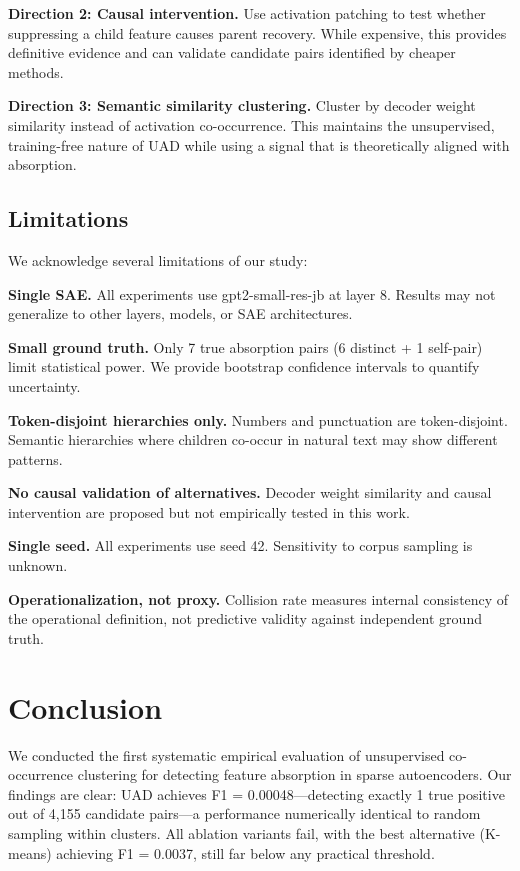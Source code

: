 \documentclass{article}
\begin{document}
\textbf{Direction 2: Causal intervention.}
Use activation patching to test whether suppressing a child feature causes parent recovery. While expensive, this provides definitive evidence and can validate candidate pairs identified by cheaper methods.

\textbf{Direction 3: Semantic similarity clustering.}
Cluster by decoder weight similarity instead of activation co-occurrence. This maintains the unsupervised, training-free nature of UAD while using a signal that is theoretically aligned with absorption.

\subsection{Limitations}

We acknowledge several limitations of our study:

\textbf{Single SAE.} All experiments use gpt2-small-res-jb at layer 8. Results may not generalize to other layers, models, or SAE architectures.

\textbf{Small ground truth.} Only 7 true absorption pairs (6 distinct + 1 self-pair) limit statistical power. We provide bootstrap confidence intervals to quantify uncertainty.

\textbf{Token-disjoint hierarchies only.} Numbers and punctuation are token-disjoint. Semantic hierarchies where children co-occur in natural text may show different patterns.

\textbf{No causal validation of alternatives.} Decoder weight similarity and causal intervention are proposed but not empirically tested in this work.

\textbf{Single seed.} All experiments use seed 42. Sensitivity to corpus sampling is unknown.

\textbf{Operationalization, not proxy.} Collision rate measures internal consistency of the operational definition, not predictive validity against independent ground truth.

\section{Conclusion}
\label{sec:conclusion}

We conducted the first systematic empirical evaluation of unsupervised co-occurrence clustering for detecting feature absorption in sparse autoencoders. Our findings are clear: UAD achieves F1 = 0.00048---detecting exactly 1 true positive out of 4,155 candidate pairs---a performance numerically identical to random sampling within clusters. All ablation variants fail, with the best alternative (K-means) achieving F1 = 0.0037, still far below any practical threshold.
\end{document}
